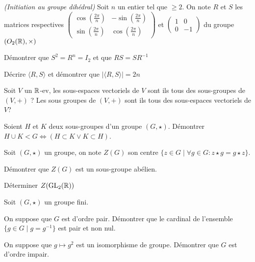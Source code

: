 \documentclass{report}
\begin{document}
\begin{exo} \textit{(Initiation au groupe dihédral)}
    Soit \(n\) un entier tel que \(\geq 2\). On note \(R\) et \(S\) les matrices
    respectives \(\begin{pmatrix}
        \cos(\frac{2\pi}{n}) & -\sin(\frac{2\pi}{n}) \\
        \sin(\frac{2\pi}{n}) & \cos(\frac{2\pi}{n})
    \end{pmatrix}\) et \(\begin{pmatrix}1 & 0 \\ 0 & -1\end{pmatrix}\)
    du groupe \(\left(O_2(\mathbb{R}), \times\right)\)
    \begin{q}{1}
        Démontrer que \(S^2=R^n=I_2\) et que \(RS=SR^{-1}\)
    \end{q}
    \begin{q}{2}
        Décrire \(\langle R,S\rangle\) et démontrer que \(|\langle R,S\rangle|=2n\)
    \end{q}
\end{exo}

\begin{exo}
    Soit \(V\) un \(\mathbb{R}\)-ev, les sous-espaces vectoriels de \(V\) sont ils tous des
    sous-groupes de \(\left(V,+\right)\) ? Les sous groupes de \(\left(V,+\right)\)
    sont ils tous des sous-espaces vectoriels de \(V\)?
\end{exo}

\begin{exo}
    Soient \(H\) et \(K\) deux sous-groupes d'un groupe \(\left(G,\star\right)\).
    Démontrer \(H\cup K<G\Leftrightarrow (H\subset K \lor K\subset H)\).
\end{exo}

\begin{exo}
    Soit \(\left(G,\star\right)\) un groupe, on note \(Z(G)\) son centre
    \(\{z\in G\mid \forall g\in G : z\star g = g\star z\}\).
    \begin{q}{1}
        Démontrer que \(Z(G)\) est un sous-groupe abélien.
    \end{q}
    \begin{q}{2}
        Déterminer \(Z(\textrm{GL}_2(\mathbb{R}))\)
    \end{q}
\end{exo}

\begin{exo}
    Soit \(\left(G,\star\right)\) un groupe fini.
    \begin{q}{1}
        On suppose que \(G\) est d'ordre pair. Démontrer que le cardinal
        de l'ensemble \(\{g\in G\mid g=g^{-1}\}\) est pair et non nul.
    \end{q}
    \begin{q}{2}
        On suppose que \(g\mapsto g^2\) est un isomorphisme de groupe. Démontrer que
        \(G\) est d'ordre impair.
    \end{q}
\end{exo}
\end{document}
